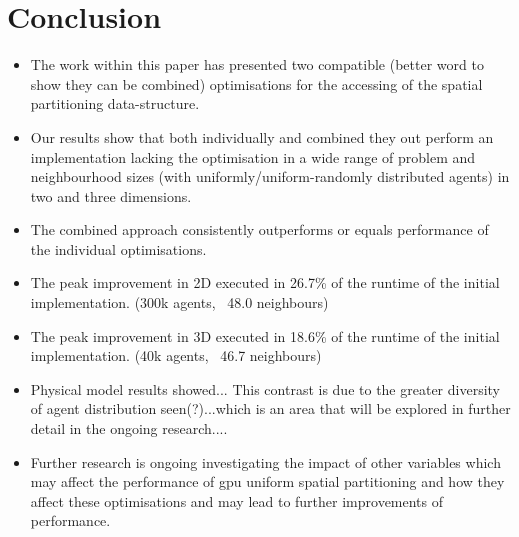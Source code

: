 \section{Conclusion\label{sec:conclusion}}
    \begin{itemize}
      \item The work within this paper has presented two compatible (better word to show they can be combined) optimisations for the accessing of the spatial partitioning data-structure.
      \item Our results show that both individually and combined they out perform an implementation lacking the optimisation in a wide range of problem and neighbourhood sizes (with uniformly/uniform-randomly distributed agents) in two and three dimensions.
      \item The combined approach consistently outperforms or equals performance of the individual optimisations.
      \item The peak improvement in 2D executed in 26.7\% of the runtime of the initial implementation. (300k agents, ~48.0 neighbours)
      \item The peak improvement in 3D executed in 18.6\% of the runtime of the initial implementation. (40k agents, ~46.7 neighbours)
      \item Physical model results showed... This contrast is due to the greater diversity of agent distribution seen(?)...which is an area that will be explored in further detail in the ongoing research....
      \item Further research is ongoing investigating the impact of other variables which may affect the performance of \gls{gpu} uniform spatial partitioning and how they affect these optimisations and may lead to further improvements of performance.
    \end{itemize}